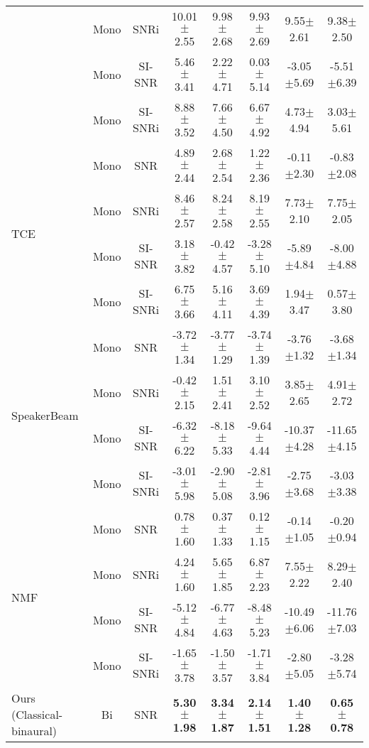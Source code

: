 \begin{table}[t]
\begin{center}
{\begin{tabular}{lccccccc}
            & Mono & SNRi   & 10.01$\pm$2.55 & 9.98$\pm$2.68 & 9.93$\pm$2.69 & 9.55$\pm$2.61 & 9.38$\pm$2.50 \\
            & Mono & SI-SNR & 5.46$\pm$3.41 & 2.22$\pm$4.71 & 0.03$\pm$5.14 & -3.05$\pm$5.69 & -5.51$\pm$6.39 \\
            & Mono & SI-SNRi & 8.88$\pm$3.52 & 7.66$\pm$4.50 & 6.67$\pm$4.92 & 4.73$\pm$4.94 & 3.03$\pm$5.61 \\
\midrule
\multirow{4}{*}{TCE \cite{Chen2024tce}}        & Mono & SNR    & 4.89$\pm$2.44 & 2.68$\pm$2.54 & 1.22$\pm$2.36 & -0.11$\pm$2.30 & -0.83$\pm$2.08 \\
           & Mono & SNRi   & 8.46$\pm$2.57 & 8.24$\pm$2.58 & 8.19$\pm$2.55 & 7.73$\pm$2.10 & 7.75$\pm$2.05 \\
           & Mono & SI-SNR & 3.18$\pm$3.82 & -0.42$\pm$4.57 & -3.28$\pm$5.10 & -5.89$\pm$4.84 & -8.00$\pm$4.88 \\
           & Mono & SI-SNRi & 6.75$\pm$3.66 & 5.16$\pm$4.11 & 3.69$\pm$4.39 & 1.94$\pm$3.47 & 0.57$\pm$3.80 \\
\midrule
\multirow{4}{*}{SpeakerBeam \cite{speakerbeam}} & Mono & SNR    & -3.72$\pm$1.34 & -3.77$\pm$1.29 & -3.74$\pm$1.39 & -3.76$\pm$1.32 & -3.68$\pm$1.34 \\
            & Mono & SNRi   & -0.42$\pm$2.15 & 1.51$\pm$2.41 & 3.10$\pm$2.52 & 3.85$\pm$2.65 & 4.91$\pm$2.72 \\
            & Mono & SI-SNR & -6.32$\pm$6.22 & -8.18$\pm$5.33 & -9.64$\pm$4.44 & -10.37$\pm$4.28 & -11.65$\pm$4.15 \\
            & Mono & SI-SNRi & -3.01$\pm$5.98 & -2.90$\pm$5.08 & -2.81$\pm$3.96 & -2.75$\pm$3.68 & -3.03$\pm$3.38 \\
\midrule
\multirow{4}{*}{NMF \cite{NMF}} & Mono & SNR       & 0.78$\pm$1.60 & 0.37$\pm$1.33 & 0.12$\pm$1.15 & -0.14$\pm$1.05 & -0.20$\pm$0.94 \\
    & Mono & SNRi      & 4.24$\pm$1.60 & 5.65$\pm$1.85 & 6.87$\pm$2.23 & 7.55$\pm$2.22 & 8.29$\pm$2.40 \\
    & Mono & SI-SNR    & -5.12$\pm$4.84 & -6.77$\pm$4.63 & -8.48$\pm$5.23 & -10.49$\pm$6.06 & -11.76$\pm$7.03 \\
    & Mono & SI-SNRi   & -1.65$\pm$3.78 & -1.50$\pm$3.57 & -1.71$\pm$3.84 & -2.80$\pm$5.05 & -3.28$\pm$5.74 \\
\midrule \midrule
\multirow{4}{*}{Ours (Classical-binaural)} & Bi & SNR   & \textbf{5.30$\pm$1.98} & \textbf{3.34$\pm$1.87} & \textbf{2.14$\pm$1.51} & \textbf{1.40$\pm$1.28} & \textbf{0.65$\pm$0.78} \\

\end{tabular}}
\end{center}
\end{table}
